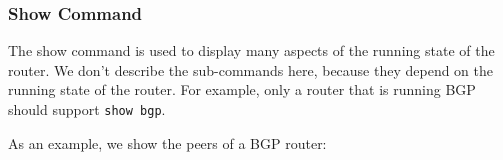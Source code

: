 \documentclass[11pt]{article}
\begin{document}
\subsubsection{Show Command}
\noindent{}
\vspace{0.1in}

\noindent
The show command is used to display many aspects of the running state
of the router.  We don't describe the sub-commands here, because they
depend on the running state of the router.  For example, only a router
that is running BGP should support {\tt show bgp}.  

As an example, we show the peers of a BGP router:
\vspace{0.1in}
\end{document}
